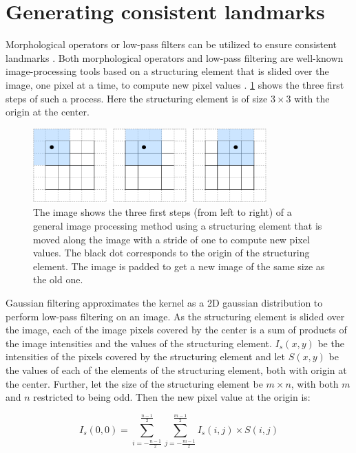 \section{Generating consistent landmarks}

Morphological operators or low-pass filters can be utilized to ensure consistent landmarks \cite{Yuan2016AnNavigation}. Both morphological operators and low-pass filtering are well-known image-processing tools based on a structuring element that is slided over the image, one pixel at a time, to compute new pixel values \cite{Gonzalez2018DigitalProcessing}. \cref{fig:image_processing_basics} shows the three first steps of such a process. Here the structuring element is of size $3\times3$ with the origin at the center. 

\begin{figure}
    \centering
    \includegraphics[width=0.8\textwidth]{figures/Image_processing_essentials.drawio.pdf}
    \caption{The image shows the three first steps (from left to right) of a general image processing method using a structuring element that is moved along the image with a stride of one to compute new pixel values. The black dot corresponds to the origin of the structuring element. The image is padded to get a new image of the same size as the old one.}
    \label{fig:image_processing_basics}
\end{figure}

Gaussian filtering approximates the kernel as a 2D gaussian distribution to perform low-pass filtering on an image. As the structuring element is slided over the image, each of the image pixels covered by the center is a sum of products of the image intensities and the values of the structuring element. $I_s(x,y)$ be the intensities of the pixels covered by the structuring element and let $S(x,y)$ be the values of each of the elements of the structuring element, both with origin at the center. Further, let the size of the structuring element be $m\times n$, with both $m$ and $n$ restricted to being odd. Then the new pixel value at the origin is:

\begin{equation}
    I_s(0,0) = \sum_{i = -\frac{n-1}{2}}^\frac{n-1}{2} \sum_{j = -\frac{m-1}{2}}^\frac{m-1}{2} I_s(i,j) \times S(i,j)
    \label{eq:gaussian_blur}
\end{equation}

